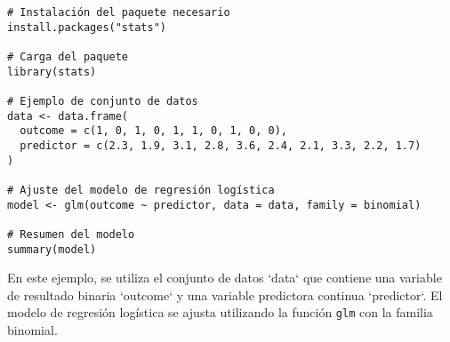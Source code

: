 \documentclass{article}
\begin{document}
\begin{verbatim}
# Instalación del paquete necesario
install.packages("stats")

# Carga del paquete
library(stats)

# Ejemplo de conjunto de datos
data <- data.frame(
  outcome = c(1, 0, 1, 0, 1, 1, 0, 1, 0, 0),
  predictor = c(2.3, 1.9, 3.1, 2.8, 3.6, 2.4, 2.1, 3.3, 2.2, 1.7)
)

# Ajuste del modelo de regresión logística
model <- glm(outcome ~ predictor, data = data, family = binomial)

# Resumen del modelo
summary(model)
\end{verbatim}

En este ejemplo, se utiliza el conjunto de datos `data` que contiene una variable de resultado binaria `outcome` y una variable predictora continua `predictor`. El modelo de regresión logística se ajusta utilizando la función \texttt{glm} con la familia binomial.
\end{document}
